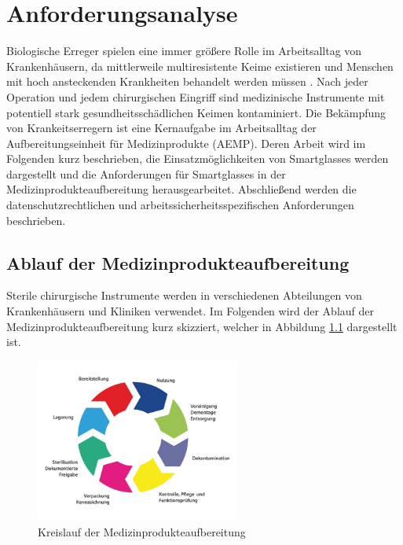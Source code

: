 %
%
%
%
%
%
\chapter{Anforderungsanalyse}
\label{ch:Anforderungsanalyse}
Biologische Erreger spielen eine immer größere Rolle im Arbeitsalltag von Krankenhäusern, da mittlerweile multiresistente Keime existieren und Menschen mit hoch ansteckenden Krankheiten behandelt werden müssen \cite{Niknam2017}. Nach jeder Operation und jedem chirurgischen Eingriff sind medizinische Instrumente mit potentiell stark gesundheitsschädlichen Keimen kontaminiert. Die Bekämpfung von Krankeitserregern ist eine Kernaufgabe im Arbeitsalltag der Aufbereitungseinheit für Medizinprodukte (AEMP). Deren Arbeit wird im Folgenden kurz beschrieben, die Einsatzmöglichkeiten von Smartglasses werden dargestellt und die Anforderungen für Smartglasses in der Medizinprodukteaufbereitung herausgearbeitet. Abschließend werden die datenschutzrechtlichen und arbeitssicherheitsspezifischen Anforderungen beschrieben.
%
%
%
%
%
%
\section{Ablauf der Medizinprodukteaufbereitung}
\label{sec:Ablauf_der_Medizinprodukteaufbereitung}
Sterile chirurgische Instrumente werden in verschiedenen Abteilungen von Krankenhäusern und Kliniken verwendet. Im Folgenden wird der Ablauf der Medizinprodukteaufbereitung kurz skizziert, welcher in Abbildung \ref{fig:Ablauf_der_Medizinprodukteaufbereitung} dargestellt ist.
%
\begin{figure}[htbp]
    \centering
    \includegraphics[width=0.6\textwidth]{data/bilder/kreislauf-ZSVA.png}
    \caption{Kreislauf der Medizinprodukteaufbereitung \cite{AKI-ArbeitskreisInstrumenten-Aufbereitung2012}}
    \label{fig:Ablauf_der_Medizinprodukteaufbereitung}
\end{figure}

